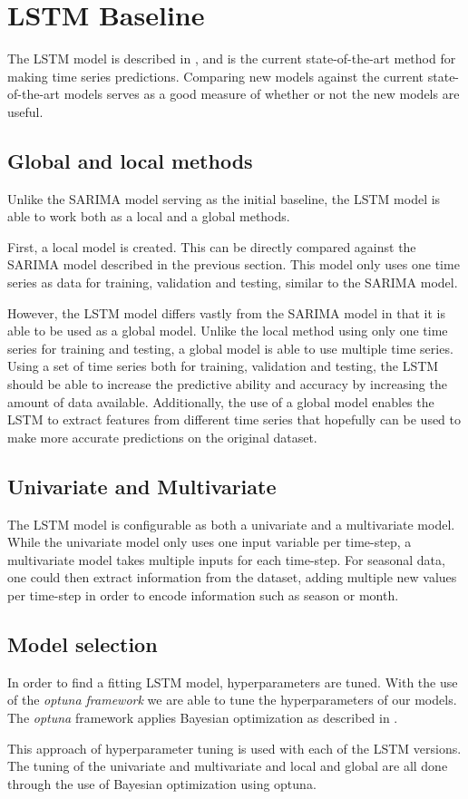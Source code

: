 
\section{LSTM Baseline}
\label{section:Architecture:Baselines:LSTM}

The LSTM model is described in , and is the current state-of-the-art method for making time series predictions.
Comparing new models against the current state-of-the-art models serves as a good measure of whether or not the new models are useful.

\subsection{Global and local methods}
Unlike the SARIMA model serving as the initial baseline,
the LSTM model is able to work both as a local and a global methods.

First, a local model is created. This can be directly compared against the SARIMA model described in the previous section.
This model only uses one time series as data for training, validation and testing, similar to the SARIMA model.

However, the LSTM model differs vastly from the SARIMA model in that it is able to be used as a global model.
Unlike the local method using only one time series for training and testing,
a global model is able to use multiple time series.
Using a set of time series both for training, validation and testing,
the LSTM should be able to increase the predictive ability and accuracy by increasing the amount of data available.
Additionally, the use of a global model enables the LSTM to extract features from different time series that hopefully can be used to make more accurate predictions on the original dataset.

\subsection{Univariate and Multivariate}
The LSTM model is configurable as both a univariate and a multivariate model.
While the univariate model only uses one input variable per time-step, a multivariate model takes multiple inputs for each time-step.
For seasonal data, one could then extract information from the dataset, adding multiple new values per time-step in order to encode information such as season or month.

\subsection{Model selection}
In order to find a fitting LSTM model, hyperparameters are tuned.
With the use of the \textit{optuna framework} %
we are able to tune the hyperparameters of our models.
The \textit{optuna} framework applies Bayesian optimization as described in .

This approach of hyperparameter tuning is used with each of the LSTM versions.
The tuning of the univariate and multivariate and local and global are all done through the use of Bayesian optimization using optuna.



